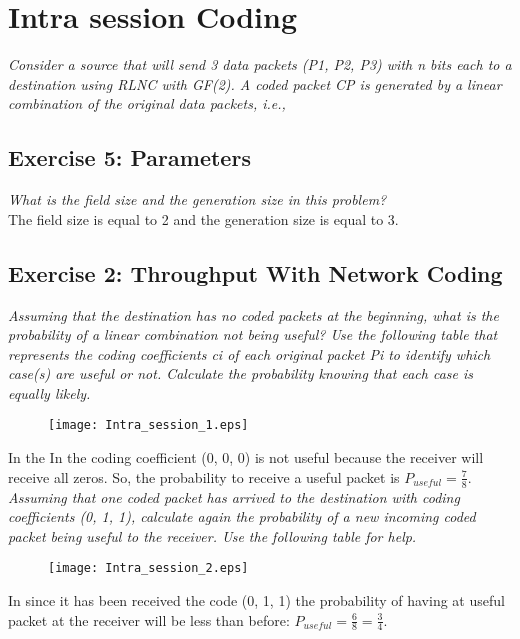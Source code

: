 \section{Intra session Coding}
\textit{Consider a source that will send 3 data packets (P1, P2, P3) with n bits each to a destination using RLNC with GF(2). A coded packet CP is generated by a linear combination of the original data packets, i.e.,}

\subsection{Exercise 5: Parameters }
\textit{What is the field size and the generation size in this problem?}\\

The field size is equal to 2 and the generation size is equal to 3. 

\subsection{Exercise 2: Throughput With Network Coding}
\textit{Assuming that the destination has no coded packets at the beginning, what is the probability of a linear combination not being useful? Use the following table that represents the coding coefficients ci of each original packet Pi to identify which case(s) are useful or not. Calculate the probability knowing that each case is equally likely.}\\
\begin{figure}[!h]
  \centering
  \texttt{[image: Intra\_session\_1.eps]}
  \caption{}
  \label{fig:Intra_session_1}
\end{figure}
In the In  the coding coefficient (0, 0, 0) is not useful because the receiver will receive all zeros. So, the probability to receive a useful packet is $P_{useful}=\frac{7}{8}$.\\

\textit{Assuming that one coded packet has arrived to the destination with coding coefficients (0, 1, 1), calculate again the probability of a new incoming coded packet being useful to the receiver. Use the following table for help.}\begin{figure}[!h]
  \centering
  \texttt{[image: Intra\_session\_2.eps]}
  \caption{}
  \label{fig:Intra_session_2}
\end{figure}

In  since it has been received the code (0, 1, 1) the probability of having at useful packet at the receiver will be less than before: $P_{useful}=\frac{6}{8}=\frac{3}{4}$.\\

